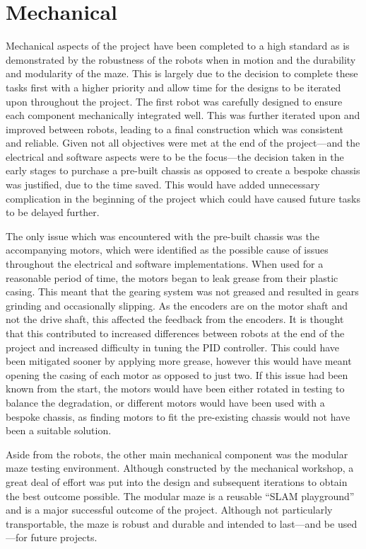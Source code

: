 \section{Mechanical}\label{eval/mech}
Mechanical aspects of the project have been completed to a
high standard as is demonstrated by the robustness of the robots when in
motion and the durability and modularity of the maze. This is largely due to the
decision to complete these tasks first with a higher priority and allow time for the
designs to be iterated upon throughout the project. The first robot was carefully
designed to ensure each component mechanically integrated well. This was further
iterated upon and improved between robots, leading to a final construction which was
consistent and reliable. Given not all objectives were met at the end of the project---and the electrical and software aspects were to be the focus---the decision taken in the
early stages to purchase a pre-built chassis as opposed to create a bespoke chassis
was justified, due to the time saved. This would have added unnecessary complication
in the beginning of the project which could have caused future
tasks to be delayed further.

The only issue which was encountered with the pre-built chassis was the
accompanying motors, which were identified as the possible cause of
issues throughout the electrical and software implementations. When used
for a reasonable period of time, the motors began to leak grease from
their plastic casing. This meant that the gearing system was not greased
and resulted in gears grinding and occasionally slipping. As the
encoders are on the motor shaft and not the drive shaft, this affected
the feedback from the encoders. It is thought that this contributed to
increased differences between robots at the end of the project and
increased difficulty in tuning the PID controller. This could have been
mitigated sooner by applying more grease, however this would have meant
opening the casing of each motor as opposed to just two. If this issue
had been known from the start, the motors would have been either rotated
in testing to balance the degradation, or different motors would have
been used with a bespoke chassis, as finding motors to fit the pre-existing
chassis would not have been a suitable solution.

Aside from the robots, the other main mechanical component was the modular maze
testing environment. Although constructed by the mechanical workshop, a great deal of
effort was put into the design and subsequent iterations to obtain the best outcome
possible. The modular maze is a reusable ``SLAM playground'' and is a major
successful outcome of the project. Although not particularly transportable, the maze
is robust and durable and intended to last---and be used---for future projects.

